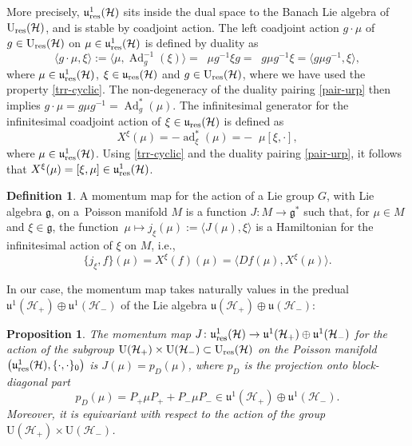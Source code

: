 \documentclass[pdftex]{sigma}
\newtheorem{prop}[thm]{Proposition}
\theoremstyle{definition}
\newtheorem{defn}[thm]{Definition}
\numberwithin{equation}{section}
\renewcommand{\H}{\mathcal{H}}
\newcommand{\g}{\mathfrak{g}}
\newcommand{\Up}{\mathrm{U}(\H_+)}\newcommand{\Um}{\mathrm{U}(\H_-)}
\newcommand{\Ur}{\mathrm{U}_{\textnormal{res}}(\H)}
\newcommand{\uup}{\mathfrak u(\H_+)}\newcommand{\uum}{\mathfrak u(\H_-)}
\newcommand{\uujp}{\mathfrak u^1(\H_+)}\newcommand{\uujm}{\mathfrak u^1(\H_-)}
\newcommand{\ur}{\mathfrak u_{\textnormal{res}}(\H)}
\newcommand{\urp}{\mathfrak u_{\textnormal{res}}^1(\H)}
\DeclareMathOperator{\Trr}{Tr_{res}}
\DeclareMathOperator{\ad}{ad}
\DeclareMathOperator{\Ad}{Ad}
\newcommand{\pb}{\{\cdot,\cdot\}}
\renewcommand{\to}{\rightarrow}
\newcommand{\be}{\begin{equation}}
\newcommand{\ee}{\end{equation}}
\begin{document}
More precisely, $\urp$ sits inside the dual space to the Banach Lie algebra of $\Ur$, and is stable by coadjoint action. The left coadjoint action $g\cdot \mu$ of $g\in \Ur$ on $\mu\in \urp$ is defined by duality as
\[
\langle g\cdot \mu , \xi \rangle := \bigl\langle \mu , \Ad_g^{-1}(\xi)\bigr\rangle = \Trr \mu g^{-1}\xi g = \Trr g \mu g^{-1} \xi = \bigl\langle g\mu g^{-1} , \xi \bigr\rangle,
\]
where $\mu \in \urp$, $\xi\in \ur$ and $g\in \Ur$, where we have used the property \eqref{trr-cyclic}. The non-degeneracy of the duality pairing \eqref{pair-urp} then implies
$
g\cdot \mu = g \mu g^{-1} = \Ad^*_g(\mu)$.
The infinitesimal generator  for the infinitesimal coadjoint action of $\xi \in \ur$ is defined as
\be\label{infinitesimal} X^\xi(\mu) = - \ad^*_\xi(\mu) = -\Trr \mu [\xi, \cdot],\ee
where $\mu\in\urp$. Using \eqref{trr-cyclic} and the duality pairing \eqref{pair-urp}, it follows that
$
 X^\xi(\mu) = [\xi,\mu]\in \urp$.
\begin{defn}
A momentum map for the action of a Lie group $G$, with Lie algebra $\g$, on a~Poisson manifold $M$ is a function $J\colon M\rightarrow \g^*$ such that, for $\mu\in M$ and $\xi \in \g$,
the function~${\mu\mapsto j_\xi(\mu) := \langle J(\mu) , \xi \rangle}$ is a Hamiltonian for the infinitesimal action of $\xi$ on $M$, i.e.,
\[
\{j_\xi, f\}(\mu) = X^\xi(f)(\mu) = \bigl\langle Df(\mu), X^\xi(\mu)\bigr\rangle.
\]
\end{defn}
In our case, the momentum map takes naturally values in the predual $\uujp\oplus\uujm$ of the Lie algebra $\uup\oplus\uum$:
\begin{prop}
The momentum map $J\colon\urp \to \uujp\oplus \uujm$ for the action of the subgroup $\Up\times\Um\subset \Ur$ on the Poisson manifold $\bigl(\urp, \pb_0\bigr)$ is
$J(\mu) = p_D(\mu)$,
where $p_D$ is the projection onto block-diagonal part
\[
 p_D(\mu) = P_+ \mu P_+ + P_- \mu P_- \in\uujp\oplus\uujm.\]
Moreover, it is equivariant with respect to the action of the group $\Up\times\Um$.
\end{prop}
\end{document}
